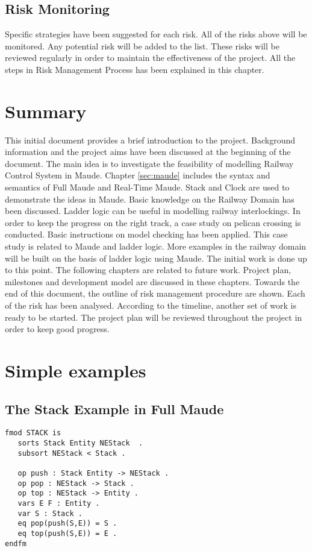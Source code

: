 \documentclass[a4paper,11pt]{report}
\begin{document}
\section{Risk Monitoring}
Specific strategies have been suggested for each risk. All of the risks above will be monitored. Any potential risk will be added to the list. These risks will be reviewed regularly in order to maintain the effectiveness of the project. All the steps in Risk Management Process has been explained in this chapter.
\chapter{Summary}
This initial document provides a brief introduction to the project. Background information and the project aims have been discussed at the beginning of the document. The main idea is to investigate the feasibility of modelling Railway Control System in Maude. Chapter \ref{sec:maude} includes the syntax and semantics of Full Maude and Real-Time Maude. Stack and Clock are used to demonstrate the ideas in Maude. Basic knowledge on the Railway Domain has been discussed. Ladder logic can be useful in modelling railway interlockings. In order to keep the progress on the right track, a case study on pelican crossing is conducted. Basic instructions on model checking has been applied. This case study is related to Maude and ladder logic. More examples in the railway domain will be built on the basis of ladder logic using Maude. The initial work is done up to this point. The following chapters are related to future work. Project plan, milestones and development model are discussed in these chapters. Towards the end of this document, the outline of risk management procedure are shown. Each of the risk has been analysed. According to the timeline, another set of work is ready to be started. The project plan will be reviewed throughout the project in order to keep good progress.
\newline \newline
\newpage    
\nocite{*}


\newpage
\appendix
\chapter{Simple examples}
\section*{The Stack Example in Full Maude}
\begin{verbatim}
fmod STACK is
   sorts Stack Entity NEStack  .
   subsort NEStack < Stack .
	
   op push : Stack Entity -> NEStack .
   op pop : NEStack -> Stack .
   op top : NEStack -> Entity .
   vars E F : Entity .
   var S : Stack .
   eq pop(push(S,E)) = S . 
   eq top(push(S,E)) = E .   
endfm
\end{verbatim}
\end{document}
